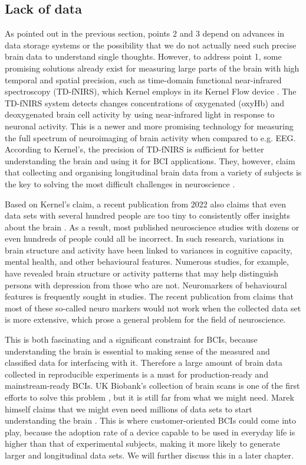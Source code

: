 \subsection{Lack of data}
\label{chapter2-lack-of-data}

As pointed out in the previous section, points 2 and 3 depend on advances in data storage systems or the possibility that we do not actually need such precise brain data to understand single thoughts. However, to address point 1, some promising solutions already exist for measuring large parts of the brain with high temporal and spatial precision, such as time-domain functional near-infrared spectroscopy (TD-fNIRS), which Kernel employs in its Kernel Flow device \citep{ban_kernel_2021}. The TD-fNIRS system detects changes concentrations of oxygenated (oxyHb) and deoxygenated brain cell activity by using near-infrared light in response to neuronal activity. This is a newer and more promising technology for measuring the full spectrum of neuroimaging of brain activity when compared to e.g. EEG. According to Kernel's, the precision of TD-fNIRS is sufficient for better understanding the brain and using it for BCI applications. They, however, claim that collecting and organising longitudinal brain data from a variety of subjects is the key to solving the most difficult challenges in neuroscience \citep{kernel_hello-humanitypdf_nodate}.

Based on Kernel's claim, a recent publication from 2022 also claims that even data sets with several hundred people are too tiny to consistently offer insights about the brain \citep{marek_reproducible_2022}. As a result, most published neuroscience studies with dozens or even hundreds of people could all be incorrect. In such research, variations in brain structure and activity have been linked to variances in cognitive capacity, mental health, and other behavioural features. Numerous studies, for example, have revealed brain structure or activity patterns that may help distinguish persons with depression from those who are not. Neuromarkers of behavioural features is frequently sought in studies. The recent publication from \citeauthor{marek_reproducible_2022} claims that most of these so-called neuro markers would not work when the collected data set is more extensive, which prose a general problem for the field of neuroscience.

This is both fascinating and a significant constraint for BCIs, because understanding the brain is essential to making sense of the measured and classified data for interfacing with it. Therefore a large amount of brain data collected in reproducible experiments is a must for production-ready and mainstream-ready BCIs. UK Biobank's collection of brain scans is one of the first efforts to solve this problem \citep{noauthor_imaging_nodate}, but it is still far from what we might need. Marek himself claims that we might even need millions of data sets to start understanding the brain \citep{callaway_can_2022}. This is where customer-oriented BCIs could come into play, because the adoption rate of a device capable to be used in everyday life is higher than that of experimental subjects, making it more likely to generate larger and longitudinal data sets. We will further discuss this in a later chapter.

